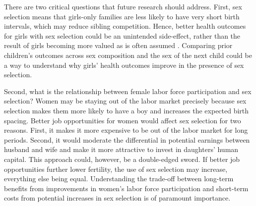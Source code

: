 \documentclass[12pt,letterpaper]{article}
\begin{document}

There are two critical questions that future research should address.
First, sex selection means that girls-only families are less likely to have
very short birth intervals, which may reduce sibling competition. 
Hence, better health outcomes for girls with sex selection could be an unintended 
side-effect, rather than the result of girls becoming more valued as is often 
assumed \citep{Hu2015}. 
Comparing prior children's outcomes across sex composition and the sex of the next child 
could be a way to understand why girls' health outcomes improve in the presence of sex selection.

Second, what is the relationship between female labor force participation and sex selection? 
Women may be staying out of the labor market precisely because sex selection makes 
them more likely to have a boy and increases the expected birth spacing. 
Better job opportunities for women would affect sex selection for two reasons. 
First, it makes it more expensive to be out of the labor market for long periods. 
Second, it would moderate the differential in potential earnings between husband and wife 
and make it more attractive to invest in daughters' human capital. 
This approach could, however, be a double-edged sword. 
If better job opportunities further lower fertility, the use of sex selection may increase, 
everything else being equal.
Understanding the trade-off between long-term benefits from improvements in women's labor 
force participation and short-term costs from potential increases in sex selection is of 
paramount importance.





\clearpage

\onehalfspacing






\clearpage
\newpage

\appendix
\end{document}
